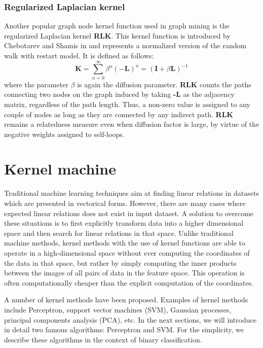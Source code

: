 \subsubsection{Regularized Laplacian kernel}
Another popular graph node kernel function used in graph mining is the regularized Laplacian kernel \textbf{RLK}. This kernel function is introduced by Chebotarev and Shamis in \cite{chebotarev2006matrix} and represents a normalized version of the random walk with restart model. It is defined as follows:
\begin{equation} 
\label{RLK-formula}
\textbf{K} = \sum_{n=0}^{\infty}\beta^{n}(-\textbf{L})^n = (\textbf{I} + \beta \textbf{L})^{-1}
\end{equation}
where the parameter $\beta$ is again the diffusion parameter. \textbf{RLK} counts the paths connecting two nodes on the graph induced by taking \textbf{-L} as the adjacency matrix, regardless of the path length. Thus, a non-zero value is assigned to any couple of nodes as long as they are connected by any indirect path. \textbf{RLK} remains a relatedness measure even when diffusion factor is large, by virtue of the negative weights assigned to self-loops.

\section{Kernel machine}
Traditional machine learning techniques aim at finding linear relations in datasets which are presented in vectorical forms. However, there are many cases where expected linear relations does not exist in input dataset. A solution to overcome these situations is to first explicitly transform data into a higher dimensional space and then search for linear relations in that space. Unlike traditional machine methods, kernel methods with the use of kernel functions are able to operate in a high-dimensional space without ever computing the coordinates of the data in that space, but rather by simply computing the inner products between the images of all pairs of data in the feature space. This operation is often computationally cheaper than the explicit computation of the coordinates.

A number of kernel methods have been proposed. Examples of kernel methods include Perceptron, support vector machines (SVM), Gaussian processes, principal components analysis (PCA), etc. In the next sections, we will introduce in detail two famous algorithms: Perceptron and SVM. For the simplicity, we describe these algorithms in the context of binary classification.
 
